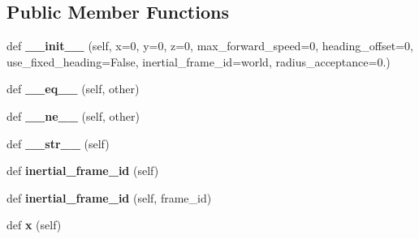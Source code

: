 \subsection*{Public Member Functions}
\begin{DoxyCompactItemize}
\item 
\mbox{\label{classuuv__waypoints_1_1waypoint_1_1Waypoint_a741d3b495505109d69e92913ca3f82b6}} 
def {\bfseries \+\_\+\+\_\+init\+\_\+\+\_\+} (self, x=0, y=0, z=0, max\+\_\+forward\+\_\+speed=0, heading\+\_\+offset=0, use\+\_\+fixed\+\_\+heading=False, inertial\+\_\+frame\+\_\+id=\textquotesingle{}world\textquotesingle{}, radius\+\_\+acceptance=0.)
\item 
\mbox{\label{classuuv__waypoints_1_1waypoint_1_1Waypoint_a978af17ffb180cf720919bf6b3d8b39d}} 
def {\bfseries \+\_\+\+\_\+eq\+\_\+\+\_\+} (self, other)
\item 
\mbox{\label{classuuv__waypoints_1_1waypoint_1_1Waypoint_a5f0ba71aa4392a93893c04291f0869dd}} 
def {\bfseries \+\_\+\+\_\+ne\+\_\+\+\_\+} (self, other)
\item 
\mbox{\label{classuuv__waypoints_1_1waypoint_1_1Waypoint_a6d1cc3f6859e7cbf65869f3548a93026}} 
def {\bfseries \+\_\+\+\_\+str\+\_\+\+\_\+} (self)
\item 
\mbox{\label{classuuv__waypoints_1_1waypoint_1_1Waypoint_a5a69908666ff1bb890b1c00591a08978}} 
def {\bfseries inertial\+\_\+frame\+\_\+id} (self)
\item 
\mbox{\label{classuuv__waypoints_1_1waypoint_1_1Waypoint_aca0cddcfdfd6b8c46cf7b1eec4cb86f8}} 
def {\bfseries inertial\+\_\+frame\+\_\+id} (self, frame\+\_\+id)
\item 
\mbox{\label{classuuv__waypoints_1_1waypoint_1_1Waypoint_ac787b26bba3b94f0e05e621ee561ba42}} 
def {\bfseries x} (self)
\item 
\mbox{\label{classuuv__waypoints_1_1waypoint_1_1Waypoint_a706236c1e72d56ab6eabd3eff991b8d5}} 

\end{DoxyCompactItemize}

